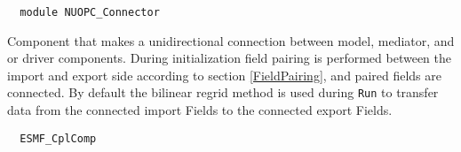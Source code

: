  
\setlength{\parskip}{0pt}
\setlength{\parindent}{0pt}
\setlength{\baselineskip}{11pt}
 
\def\bv{\begin{verbatim}}
\def\ev{\end{verbatim}}
\def\be{\begin{equation}}
\def\ee{\end{equation}}
\def\bea{\begin{eqnarray}}
\def\eea{\end{eqnarray}}
\def\bi{\begin{itemize}}
\def\ei{\end{itemize}}
\def\bn{\begin{enumerate}}
\def\en{\end{enumerate}}
\def\bd{\begin{description}}
\def\ed{\end{description}}
\def\({\left (}
\def\){\right )}
\def\[{\left [}
\def\]{\right ]}
\def\<{\left  \langle}
\def\>{\right \rangle}
\def\cI{{\cal I}}
\def\diag{\mathop{\rm diag}}
\def\tr{\mathop{\rm tr}}


\begin{verbatim}  module NUOPC_Connector
\end{verbatim}

Component that makes a unidirectional connection between model, mediator, and or driver components. During initialization field pairing is performed between the import and export side according to section \ref{FieldPairing}, and paired fields are connected. By default the bilinear regrid method is used during {\tt Run} to transfer data from the connected import Fields to the connected export Fields.

\begin{verbatim}  ESMF_CplComp
\end{verbatim}

